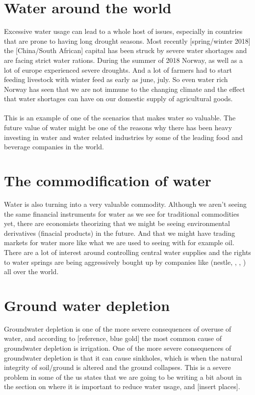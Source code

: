 \documentclass[]{uiophd}
\begin{document}
\section{Water around the world}
Excessive water usage can lead to a whole host of issues, especially in countries that are prone to having long drought seasons. Most recently [spring/winter 2018] the [China/South African] capital has been struck by severe water shortages and are facing strict water rations. During the summer of 2018 Norway, as well as a lot of europe experienced severe droughts. And a lot of farmers had to start feeding livestock with winter feed as early as {june, july}. So even water rich Norway has seen that we are not immune to the changing climate and the effect that water shortages can have on our domestic supply of agricultural goods.
\\\\
This is an example of one of the scenarios that makes water so valuable. The future value of water might be one of the reasons why there has been heavy investing in water and water related industries by some of the leading food and beverage companies in the world.

\section{The commodification of water}
Water is also turning into a very valuable commodity. Although we aren’t seeing the same financial instruments for water as we see for traditional commodities yet, there are economists theorizing that we might be seeing environmental derivatives (finacial products) in the future. And that we might have trading markets for water more like what we are used to seeing with for example oil. There are a lot of interest around controlling central water supplies and the rights to water springs are being aggressively bought up by companies like (nestle, , , ) all over the world.

\section{Ground water depletion}
Groundwater depletion is one of the more severe consequences of overuse of water, and according to [reference, blue gold] the most common cause of groundwater depletion is irrigation. One of the more severe consequences of groundwater depletion is that it can cause sinkholes, which is when the natural integrity of soil/ground is altered and the ground collapses. This is a severe problem in some of the us states that we are going to be writing a bit about in the section on where it is important to reduce water usage, and [insert places].
\end{document}
